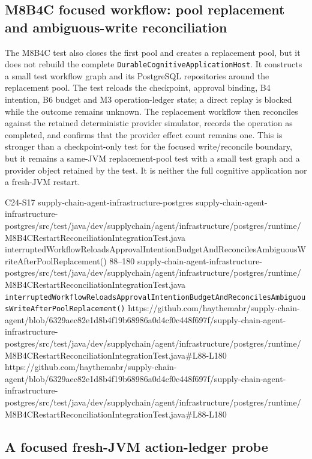 \subsection{M8B4C focused workflow: pool replacement and ambiguous-write reconciliation}

The M8B4C test also closes the first pool and creates a replacement pool, but it does not rebuild the complete \texttt{DurableCognitive\allowbreak{}ApplicationHost}. It constructs a small test workflow graph and its PostgreSQL repositories around the replacement pool. The test reloads the checkpoint, approval binding, B4 intention, B6 budget and M3 operation-ledger state; a direct replay is blocked while the outcome remains unknown. The replacement workflow then reconciles against the retained deterministic provider simulator, records the operation as completed, and confirms that the provider effect count remains one. This is stronger than a checkpoint-only test for the focused write/reconcile boundary, but it remains a same-JVM replacement-pool test with a small test graph and a provider object retained by the test. It is neither the full cognitive application nor a fresh-JVM restart.

\BookSourceReferenceNoQR
  {C24-S17}
  {supply-chain-agent-infrastructure-postgres}
  {supply-chain-agent-infrastructure-postgres/src/test/java/dev/supplychain/agent/infrastructure/postgres/runtime/M8B4CRestartReconciliationIntegrationTest.java}
  {interruptedWorkflowReloadsApprovalIntentionBudgetAndReconcilesAmbiguousWriteAfterPoolReplacement()}
  {88--180}
  {supply-chain-agent-infrastructure-postgres/src/test/java/dev/supplychain/agent/infrastructure/postgres/runtime/M8B4CRestartReconciliationIntegrationTest.java}
  {\texttt{interruptedWorkflowReloadsApprovalIntentionBudgetAndReconcilesAmbiguousWriteAfterPoolReplacement()}}
  {https://github.com/haythemabr/supply-chain-agent/blob/6329aec82e1d8b4f19b68986a0d4cf0c448f697f/supply-chain-agent-infrastructure-postgres/src/test/java/dev/supplychain/agent/infrastructure/postgres/runtime/M8B4CRestartReconciliationIntegrationTest.java\#L88-L180}
  {https://github.com/haythemabr/supply-chain-agent/blob/6329aec82e1d8b4f19b68986a0d4cf0c448f697f/supply-chain-agent-infrastructure-postgres/src/test/java/dev/supplychain/agent/infrastructure/postgres/runtime/M8B4CRestartReconciliationIntegrationTest.java\#L88-L180}

\subsection{A focused fresh-JVM action-ledger probe}

